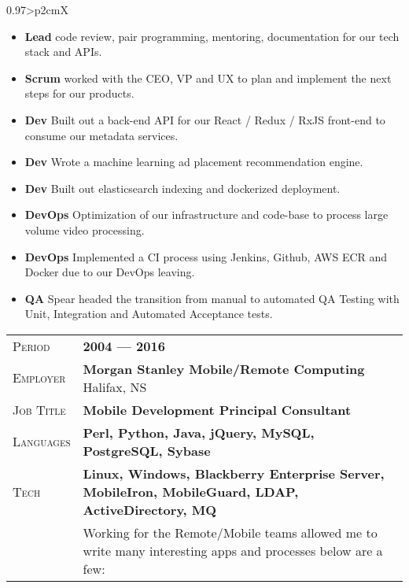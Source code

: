 \documentclass[a4paper, oneside, final]{scrartcl}
\newcommand{\gray}{\rowcolor[gray]{.90}}
\begin{document}
\begin{center}
\begin{tabularx}{0.97\linewidth}{>{\raggedleft\scshape}p{2cm}X}
\begin{itemize}
\item \textbf {Lead} code review, pair programming, mentoring, documentation for our tech stack and APIs.
\item \textbf {Scrum} worked with the CEO, VP and UX to plan and implement the next steps for our products.
\item \textbf {Dev} Built out a back-end API for our React / Redux / RxJS front-end to consume our metadata services.
\item \textbf {Dev} Wrote a machine learning ad placement recommendation engine.
\item \textbf {Dev} Built out elasticsearch indexing and dockerized deployment.
\item \textbf {DevOps} Optimization of our infrastructure and code-base to process large volume video processing.
\item \textbf {DevOps} Implemented a CI process using Jenkins, Github, AWS ECR and Docker due to our DevOps leaving.
\item \textbf {QA} Spear headed the transition from manual to automated QA Testing with Unit, Integration and Automated Acceptance tests.

\end{itemize}

\end{tabularx}

\begin{tabularx}{0.97\linewidth}{>{\raggedleft\scshape}p{2cm}X}
\gray Period & \textbf{2004 --- 2016}\\
\gray Employer & \textbf{Morgan Stanley Mobile/Remote Computing} \hfill Halifax, NS\\
\gray Job Title & \textbf{Mobile Development Principal Consultant}\\
\gray Languages & \textbf{Perl, Python, Java, jQuery, MySQL, PostgreSQL, Sybase}\\
\gray Tech & \textbf{Linux, Windows, Blackberry Enterprise Server, MobileIron, MobileGuard, LDAP, ActiveDirectory, MQ}\\
& Working for the Remote/Mobile teams allowed me to write many interesting apps and processes below are a few:


\end{tabularx}
\end{center}
\end{document}
